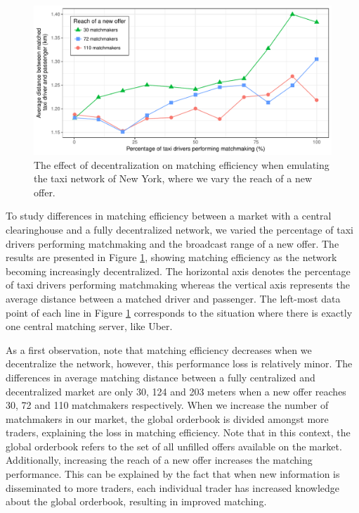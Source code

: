 \documentclass[USenglish]{article}
\begin{document}
\begin{figure}[t]
	\centering
	\includegraphics[width=1\columnwidth]{assets/matching_efficiency.pdf}
	\caption{The effect of decentralization on matching efficiency when emulating the taxi network of New York, where we vary the reach of a new offer.}
	\label{fig:matching_efficiency}
\end{figure}

To study differences in matching efficiency between a market with a central clearinghouse and a fully decentralized network, we varied the percentage of taxi drivers performing matchmaking and the broadcast range of a new offer.
The results are presented in Figure \ref{fig:matching_efficiency}, showing matching efficiency as the network becoming increasingly decentralized.
The horizontal axis denotes the percentage of taxi drivers performing matchmaking whereas the vertical axis represents the average distance between a matched driver and passenger.
The left-most data point of each line in Figure \ref{fig:matching_efficiency} corresponds to the situation where there is exactly one central matching server, like Uber.

As a first observation, note that matching efficiency decreases when we decentralize the network, however, this performance loss is relatively minor.
The differences in average matching distance between a fully centralized and decentralized market are only 30, 124 and 203 meters when a new offer reaches 30, 72 and 110 matchmakers respectively.
When we increase the number of matchmakers in our market, the global orderbook is divided amongst more traders, explaining the loss in matching efficiency.
Note that in this context, the global orderbook refers to the set of all unfilled offers available on the market.
Additionally, increasing the reach of a new offer increases the matching performance.
This can be explained by the fact that when new information is disseminated to more traders, each individual trader has increased knowledge about the global orderbook, resulting in improved matching.
\end{document}
